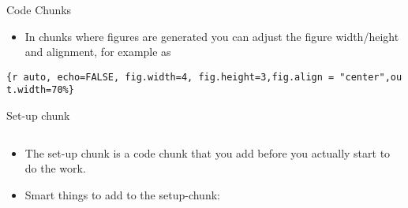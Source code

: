 \documentclass[10pt,ignorenonframetext,]{beamer}
\newenvironment{Shaded}{\begin{snugshade}}{\end{snugshade}}
\newcommand{\DataTypeTok}[1]{\textcolor[rgb]{0.13,0.29,0.53}{#1}}
\newcommand{\DecValTok}[1]{\textcolor[rgb]{0.00,0.00,0.81}{#1}}
\newcommand{\KeywordTok}[1]{\textcolor[rgb]{0.13,0.29,0.53}{\textbf{#1}}}
\newcommand{\NormalTok}[1]{#1}
\newcommand{\OperatorTok}[1]{\textcolor[rgb]{0.81,0.36,0.00}{\textbf{#1}}}
\newcommand{\OtherTok}[1]{\textcolor[rgb]{0.56,0.35,0.01}{#1}}
\newcommand{\StringTok}[1]{\textcolor[rgb]{0.31,0.60,0.02}{#1}}
\providecommand{\tightlist}{%
  \setlength{\itemsep}{0pt}\setlength{\parskip}{0pt}}
\begin{document}
\begin{frame}[fragile]
\begin{block}{Code Chunks}
\vspace{2mm}

\begin{itemize}
\tightlist
\item
  In chunks where figures are generated you can adjust the figure
  width/height and alignment, for example as
\end{itemize}

\texttt{\{r\ auto,\ echo=FALSE,\ fig.width=4,\ fig.height=3,fig.align\ =\ "center",out.width=\textquotesingle{}70\%\textquotesingle{}\}}

\end{block}

\end{frame}

\begin{frame}[fragile]

\begin{block}{Set-up chunk}

\(~\)

\begin{itemize}
\tightlist
\item
  The set-up chunk is a code chunk that you add before you actually
  start to do the work.
\end{itemize}

\vspace{2mm}

\begin{itemize}
\tightlist
\item
  Smart things to add to the setup-chunk:
\end{itemize}

\(~\)

\scriptsize

\begin{Shaded}
\end{Shaded}

\end{block}

\end{frame}
\end{document}
